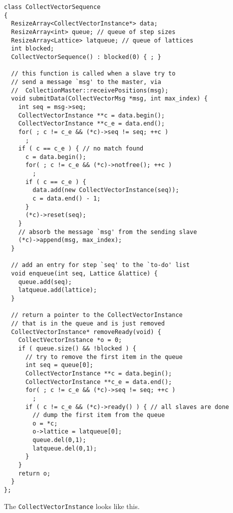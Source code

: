\documentclass{article}
\begin{document}
\begin{lstlisting}
class CollectVectorSequence
{
  ResizeArray<CollectVectorInstance*> data;
  ResizeArray<int> queue; // queue of step sizes
  ResizeArray<Lattice> latqueue; // queue of lattices
  int blocked;
  CollectVectorSequence() : blocked(0) { ; }

  // this function is called when a slave try to
  // send a message `msg' to the master, via
  //  CollectionMaster::receivePositions(msg);
  void submitData(CollectVectorMsg *msg, int max_index) {
    int seq = msg->seq;
    CollectVectorInstance **c = data.begin();
    CollectVectorInstance **c_e = data.end();
    for( ; c != c_e && (*c)->seq != seq; ++c )
      ;
    if ( c == c_e ) { // no match found
      c = data.begin();
      for( ; c != c_e && (*c)->notfree(); ++c )
        ;
      if ( c == c_e ) {
        data.add(new CollectVectorInstance(seq));
        c = data.end() - 1;
      }
      (*c)->reset(seq);
    }
    // absorb the message `msg' from the sending slave
    (*c)->append(msg, max_index);
  }

  // add an entry for step `seq' to the `to-do' list
  void enqueue(int seq, Lattice &lattice) {
    queue.add(seq);
    latqueue.add(lattice);
  }

  // return a pointer to the CollectVectorInstance
  // that is in the queue and is just removed
  CollectVectorInstance* removeReady(void) {
    CollectVectorInstance *o = 0;
    if ( queue.size() && !blocked ) {
      // try to remove the first item in the queue
      int seq = queue[0];
      CollectVectorInstance **c = data.begin();
      CollectVectorInstance **c_e = data.end();
      for( ; c != c_e && (*c)->seq != seq; ++c )
        ;
      if ( c != c_e && (*c)->ready() ) { // all slaves are done
        // dump the first item from the queue
        o = *c;
        o->lattice = latqueue[0];
        queue.del(0,1);
        latqueue.del(0,1);
      }
    }
    return o;
  }
};

\end{lstlisting}





The \texttt{CollectVectorInstance} looks like this.
\end{document}
